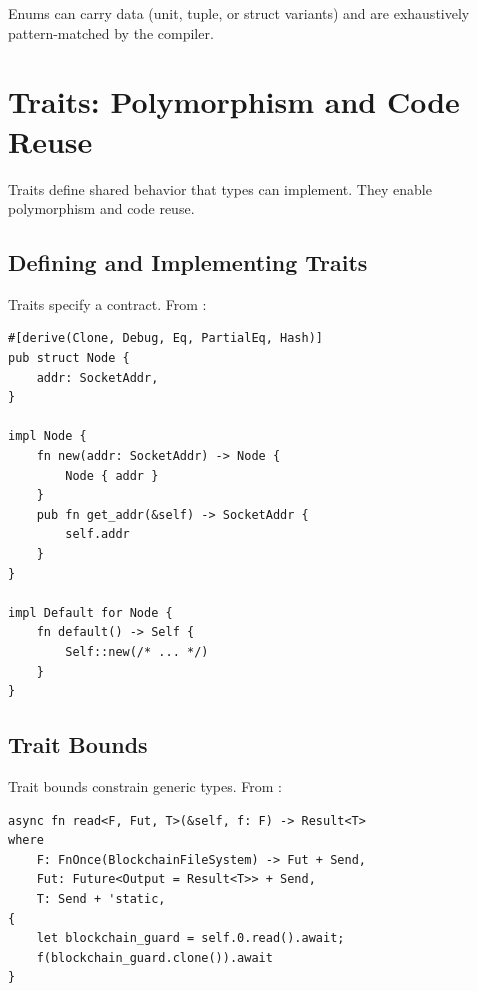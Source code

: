 Enums can carry data (unit, tuple, or struct variants) and are exhaustively pattern-matched by the compiler.

\section{Traits: Polymorphism and Code Reuse}
\label{sec:ch24-traits}

Traits define shared behavior that types can implement. They enable polymorphism and code reuse.

\subsection{Defining and Implementing Traits}
\label{subsec:ch24-trait-impl}

Traits specify a contract. From :

\begin{listing}[htbp]
\caption{Trait implementation example}
\label{lst:ch24-trait-impl}
\begin{verbatim}
#[derive(Clone, Debug, Eq, PartialEq, Hash)]
pub struct Node {
    addr: SocketAddr,
}

impl Node {
    fn new(addr: SocketAddr) -> Node {
        Node { addr }
    }
    pub fn get_addr(&self) -> SocketAddr {
        self.addr
    }
}

impl Default for Node {
    fn default() -> Self {
        Self::new(/* ... */)
    }
}
\end{verbatim}
\end{listing}

\subsection{Trait Bounds}
\label{subsec:ch24-trait-bounds}

Trait bounds constrain generic types. From :

\begin{listing}[htbp]
\caption{Trait bounds in generic functions}
\label{lst:ch24-trait-bounds}
\begin{verbatim}
async fn read<F, Fut, T>(&self, f: F) -> Result<T>
where
    F: FnOnce(BlockchainFileSystem) -> Fut + Send,
    Fut: Future<Output = Result<T>> + Send,
    T: Send + 'static,
{
    let blockchain_guard = self.0.read().await;
    f(blockchain_guard.clone()).await
}
\end{verbatim}
\end{listing}

